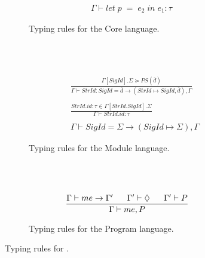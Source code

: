\begin{figure}[htbp]
\begin{subfigure}{\textwidth}
\begin{align*}
{\Gamma \vdash let\;p\;=\;e_{2}\;in\;e_{1}:\tau}
\end{align*}
\caption{Typing rules for the Core language. \label{fig:TypeRulesCore}}
\end{subfigure}
\\ \\
\begin{subfigure}{\textwidth}
\begin{align*}
\tag{T-Structure}
&\frac
{\Gamma[SigId].\Sigma \succeq PS(\overline{d})}
{\Gamma \vdash StrId : SigId = \overline{d} \rightarrow (\mathit{StrId} \mapsto {\mathit{SigId}, \overline{d}}),\Gamma}
\\
\\
\tag{T-ModVar}
&\frac
{StrId.id:\tau \in \Gamma[StrId.SigId].\Sigma}
{\Gamma \vdash \mathit{StrId.id} : \tau}
\\
\\
\tag{T-Signature}
&\Gamma \vdash SigId = \Sigma \rightarrow (\mathit{SigId} \mapsto \Sigma),\Gamma
\end{align*}
\caption{Typing rules for the Module language. \label{fig:TypeRulesModule}}
\end{subfigure}
\\ \\
\begin{subfigure}{\textwidth}

\begin{align*}
&\frac
{\Gamma \vdash me \rightarrow \Gamma' \;\;\;\;\;\; \Gamma' \vdash \Diamond \;\;\;\;\;\; \Gamma' \vdash P}
{\Gamma \vdash me, P}
\end{align*}
\caption{Typing rules for the Program language. \label{fig:TypeRulesProgram}}
\end{subfigure}
\caption{Typing rules for \MiniML.}
\end{figure}


